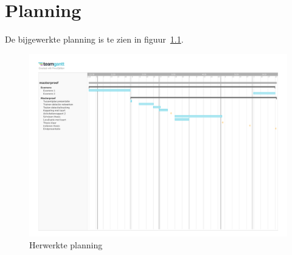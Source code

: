  
\chapter{Planning}

De bijgewerkte planning is te zien in figuur~\ref{fig:planning}.

\begin{figure}
    \centering
    \includegraphics[width=\paperwidth,angle=90]{bijlagen/planning.pdf}
    \caption{Herwerkte planning} \label{fig:planning}
\end{figure}
